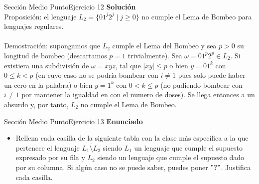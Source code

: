 \documentclass[10pt, envcountsect, presentation, aspectratio=169]{beamer}
\begin{document}

\begin{frame}{Sección Medio Punto}{Ejercicio 12}
    \textbf{Solución}\\
    Proposición: el lenguaje $L_2 = \{ 01^j2^j \mid j \geq 0 \}$ no cumple el Lema de Bombeo para lenguajes regulares.\\~\\

    Demostración: supongamos que $L_2$ cumple el Lema del Bombeo y sea $p>0$ su longitud de bombeo (descartamos $p=1$ trivialmente). 
    Sea $\omega = 01^p2^p \in L_2$. Si existiera una subdivisión de $\omega = xyz$, tal que $|xy| \leq p$ o bien $y=01^k$ con $0\leq k < p$ (en cuyo caso no se podría bombear con $i \neq 1$ pues solo puede haber un cero en la palabra)
    o bien $y=1^k$ con $0<k\leq p$ (no pudiendo bombear con $i \neq 1$ por mantener la igualdad en con el numero de doses). Se llega entonces a un absurdo y, por tanto, $L_2$ no cumple el Lema de Bombeo.
\end{frame}
    

\begin{frame}{Sección Medio Punto}{Ejercicio 13}
    \textbf{Enunciado}
    \begin{itemize}
        \item Rellena cada casilla de la siguiente tabla con la clase más específica a la que pertenece el lenguaje  $\overline{L_1 \setminus L_2}$ siendo $L_1$ un lenguaje que cumple el supuesto expresado por su fila y $L_2$ siendo un lenguaje que cumple el supuesto dado por su columna. Si algún caso no se puede saber, puedes poner   $"?"$. Justifica cada casilla.\\
    \end{itemize}
\end{frame}

\end{document}
